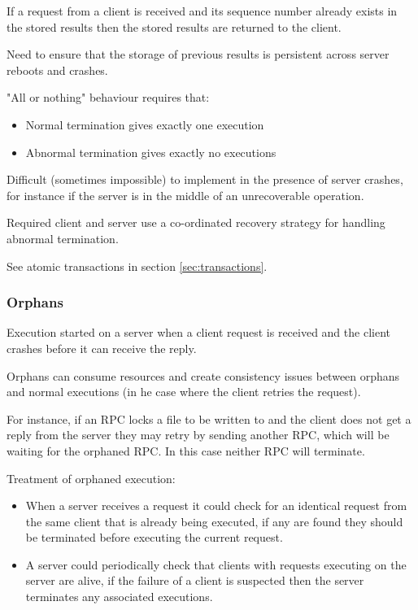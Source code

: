 \documentclass[a4paper]{article}
\begin{document}
If a request from a client is received and its sequence number already exists in
the stored results then the stored results are returned to the client.

Need to ensure that the storage of previous results is persistent across server
reboots and crashes.


"All or nothing" behaviour requires that:

\begin{itemize}
  \item Normal termination gives exactly one execution
  \item Abnormal termination gives exactly no executions
\end{itemize}

Difficult (sometimes impossible) to implement in the presence of server crashes,
for instance if the server is in the middle of an unrecoverable operation.

Required client and server use a co-ordinated recovery strategy for handling
abnormal termination.

See atomic transactions in section \ref{sec:transactions}.

\subsubsection{Orphans}
\label{sec:rpc_orphans}

Execution started on a server when a client request is received and the client
crashes before it can receive the reply.

Orphans can consume resources and create consistency issues between orphans and
normal executions (in he case where the client retries the request).

For instance, if an RPC locks a file to be written to and the client does not
get a reply from the server they may retry by sending another RPC, which will be
waiting for the orphaned RPC. In this case neither RPC will terminate.

Treatment of orphaned execution:

\begin{itemize}
  \item When a server receives a request it could check for an identical request
        from the same client that is already being executed, if any are found
        they should be terminated before executing the current request.
  \item A server could periodically check that clients with requests executing
        on the server are alive, if the failure of a client is suspected then
        the server terminates any associated executions.
\end{itemize}
\end{document}

